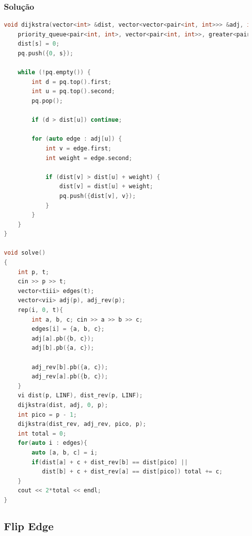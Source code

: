 \subsubsection*{Solução}
\begin{lstlisting}[language=C++]
void dijkstra(vector<int> &dist, vector<vector<pair<int, int>>> &adj, int s, int n) {
    priority_queue<pair<int, int>, vector<pair<int, int>>, greater<pair<int, int>>> pq;
    dist[s] = 0;
    pq.push({0, s});

    while (!pq.empty()) {
        int d = pq.top().first;
        int u = pq.top().second;
        pq.pop();

        if (d > dist[u]) continue;

        for (auto edge : adj[u]) {
            int v = edge.first;
            int weight = edge.second;

            if (dist[v] > dist[u] + weight) {
                dist[v] = dist[u] + weight;
                pq.push({dist[v], v});
            }
        }
    }
}

void solve()
{
    int p, t;
    cin >> p >> t;
    vector<tiii> edges(t);
    vector<vii> adj(p), adj_rev(p);
    rep(i, 0, t){
        int a, b, c; cin >> a >> b >> c;
        edges[i] = {a, b, c};
        adj[a].pb({b, c});
        adj[b].pb({a, c});

        adj_rev[b].pb({a, c});
        adj_rev[a].pb({b, c});
    }
    vi dist(p, LINF), dist_rev(p, LINF);
    dijkstra(dist, adj, 0, p);
    int pico = p - 1;
    dijkstra(dist_rev, adj_rev, pico, p);
    int total = 0;
    for(auto i : edges){
        auto [a, b, c] = i;
        if(dist[a] + c + dist_rev[b] == dist[pico] ||
           dist[b] + c + dist_rev[a] == dist[pico]) total += c;
    }
    cout << 2*total << endl;
}
\end{lstlisting}

\subsection{Flip Edge}

